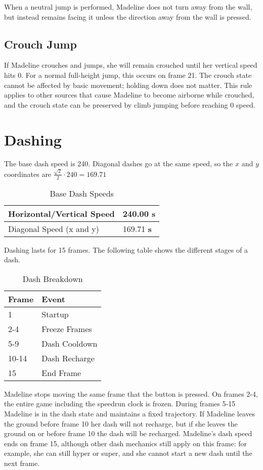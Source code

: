 \documentclass[oneside]{book}
\newcommand{\s}{\textbf{s}}
\begin{document}
When a neutral jump is performed, Madeline does not turn away from the wall, but instead remains facing it unless the direction away from the wall is pressed.

\subsection{Crouch Jump}

If Madeline crouches and jumps, she will remain crouched until her vertical speed hits 0. For a normal full-height jump, this occurs on frame 21. The crouch state cannot be affected by basic movement; holding down does not matter. This rule applies to other sources that cause Madeline to become airborne while crouched, and the crouch state can be preserved by climb jumping before reaching 0 speed.

\section{Dashing}

The base dash speed is 240. Diagonal dashes go at the same speed, so the $x$ and $y$ coordinates are $\frac{\sqrt{2}}{2}\cdot 240=169.71$

\begin{table}[h]
\begin{tabular}{|l|l|}
\hline
Horizontal/Vertical Speed&240.00 \s\\
\hline
Diagonal Speed (x and y)&169.71 \s\\
\hline
\end{tabular}
\caption{Base Dash Speeds}
\end{table}

Dashing lasts for 15 frames. The following table shows the different stages of a dash.

\begin{table}[h]
\begin{tabular}{|l|l|}
\hline
Frame&Event\\
\hline
1&Startup\\
\hline
2-4&Freeze Frames\\
\hline
5-9&Dash Cooldown\\
\hline
10-14&Dash Recharge\\
\hline
15&End Frame\\
\hline
\end{tabular}
\caption{Dash Breakdown}
\end{table}

Madeline stops moving the same frame that the button is pressed. On frames 2-4, the entire game including the speedrun clock is frozen. During frames 5-15 Madeline is in the dash state and maintains a fixed trajectory. If Madeline leaves the ground before frame 10 her dash will not recharge, but if she leaves the ground on or before frame 10 the dash will be recharged. Madeline's dash speed ends on frame 15, although other dash mechanics still apply on this frame: for example, she can still hyper or super, and she cannot start a new dash until the next frame.
\end{document}
